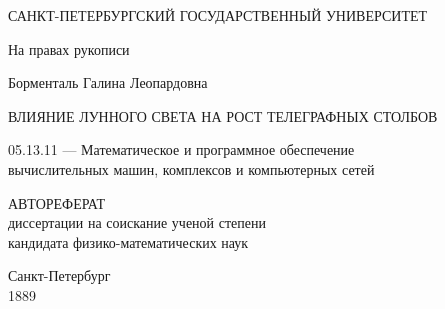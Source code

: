\documentclass[14pt,a4paper,twoside]{extarticle}
\begin{document}
\begin{titlepage}
\begin{center}
\textsc{САНКТ-ПЕТЕРБУРГСКИЙ ГОСУДАРСТВЕННЫЙ УНИВЕРСИТЕТ}\\
\end{center}
\vspace{1.5cm}
\begin{flushright}
{На правах рукописи}
\end{flushright}
\vspace{1.5cm}
\begin{center}
{Борменталь Галина Леопардовна}
\par
\vspace{2cm}
\textsc{ВЛИЯНИЕ ЛУННОГО СВЕТА НА РОСТ ТЕЛЕГРАФНЫХ СТОЛБОВ}
\par
\vspace{2cm}
{05.13.11 --- Математическое и программное обеспечение\\
вычислительных машин, комплексов и компьютерных сетей}
\par
\vspace{2cm}
{АВТОРЕФЕРАТ\\
диссертации на соискание ученой степени\\
кандидата физико-математических наук}
\end{center}
\par
\vspace{3.5cm}
\begin{center}
{Санкт-Петербург\\
1889}
\end{center}
\end{titlepage}
\end{document}
